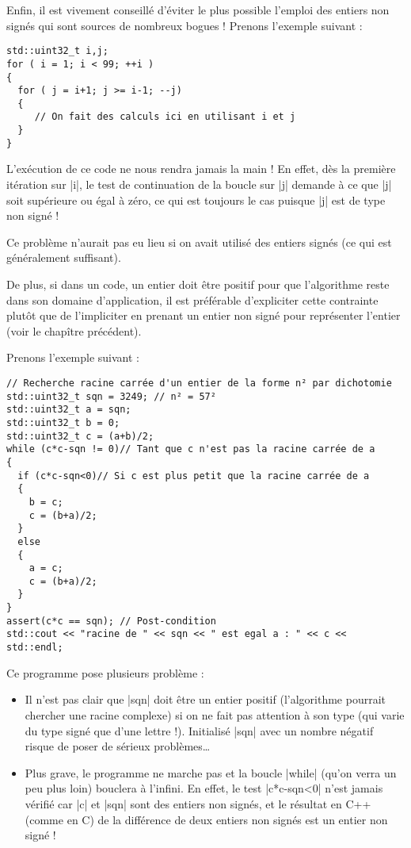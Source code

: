 Enfin, il est vivement conseillé d'éviter le plus possible l'emploi des entiers non signés qui sont sources de nombreux bogues !
Prenons l'exemple suivant :

\begin{lstlisting}[caption=Exemple de bogue généré par l'emploi d'un entier non signé]
std::uint32_t i,j;
for ( i = 1; i < 99; ++i )
{
  for ( j = i+1; j >= i-1; --j)
  {
     // On fait des calculs ici en utilisant i et j
  }
}
\end{lstlisting}

L'exécution de ce code ne nous rendra jamais la main ! En effet, dès la première itération sur |i|,
le test de continuation de la boucle sur |j| demande à ce que |j| soit supérieure ou égal à zéro, 
ce qui est toujours le cas puisque |j| est de type non signé !

Ce problème n'aurait pas eu lieu si on avait utilisé des entiers signés (ce qui est généralement suffisant).

De plus, si dans un code, un entier doit être positif pour que l'algorithme reste dans son domaine d'application, 
il est préférable d'expliciter cette contrainte plutôt que de l'impliciter en prenant un entier non signé pour
représenter l'entier (voir le chapître précédent).

Prenons l'exemple suivant :
\begin{lstlisting}[caption=Problèmes rencontrés avec les entiers non signés]
// Recherche racine carrée d'un entier de la forme n² par dichotomie
std::uint32_t sqn = 3249; // n² = 57²
std::uint32_t a = sqn;
std::uint32_t b = 0;
std::uint32_t c = (a+b)/2;
while (c*c-sqn != 0)// Tant que c n'est pas la racine carrée de a
{
  if (c*c-sqn<0)// Si c est plus petit que la racine carrée de a
  {
    b = c;
    c = (b+a)/2;
  }
  else
  {
    a = c;
    c = (b+a)/2;
  }
}
assert(c*c == sqn); // Post-condition
std::cout << "racine de " << sqn << " est egal a : " << c << std::endl;
\end{lstlisting}

Ce programme pose plusieurs problème :
\begin{itemize}
  \item Il n'est pas clair que |sqn| doit être un entier positif (l'algorithme pourrait chercher une racine complexe) si on ne fait pas attention à son type (qui varie du type signé que d'une lettre !). Initialisé |sqn| avec un nombre négatif risque de poser de sérieux problèmes\ldots
  \item Plus grave, le programme ne marche pas et la boucle |while| (qu'on verra un peu plus loin) bouclera à l'infini. En effet, le test |c*c-sqn<0| n'est jamais vérifié car |c| et |sqn| sont des entiers non signés, et le résultat en C++ (comme en C) de la différence de deux entiers non signés est un entier non signé ! 
\end{itemize}

